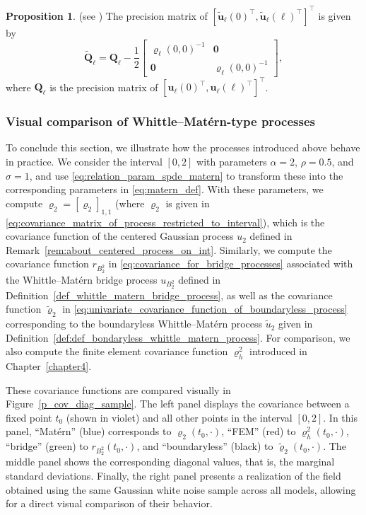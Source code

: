 \documentclass[11pt,a4paper]{article}
\theoremstyle{plain}
\theoremstyle{definition}
\newtheorem{proposition}{Proposition}
\begin{document}
\begin{proposition}
\label{prop:proposition_where_Q_edge}
    \textnormal{(see \cite[Proposition~7]{Bolin2023Statistical})}
    The precision matrix of $\left[\widetilde{\boldsymbol{u}}_\ell(0)^\top,\widetilde{\boldsymbol{u}}_\ell(\ell)^\top\right]^\top$ is given by
\begin{equation}
\label{eq:Qedge}
	\widetilde{\mathbf{Q}}_\ell  = \mathbf{Q}_\ell - \frac{1}{2}\begin{bmatrix}
		\boldsymbol{\varrho}_\ell(0,0)^{-1} & \mathbf{0} \\
		\mathbf{0} & \boldsymbol{\varrho}_\ell(0,0)^{-1} 
	\end{bmatrix},
\end{equation}
where $\mathbf{Q}_\ell$ is the precision matrix of $\left[\boldsymbol{u}_\ell(0)^\top,\boldsymbol{u}_\ell(\ell)^\top\right]^\top$.
\end{proposition}

\subsubsection{Visual comparison of Whittle--Matérn-type processes}

To conclude this section, we illustrate how the processes introduced above behave in practice. We consider the interval $[0,2]$ with parameters $\alpha = 2$, $\rho = 0.5$, and $\sigma = 1$, and use \eqref{eq:relation_param_spde_matern} to transform these into the corresponding parameters in \eqref{eq:matern_def}.  With these parameters, we compute $\varrho_2 = [\boldsymbol{\varrho}_2]_{1,1}$ (where $\boldsymbol{\varrho}_2$ is given in \eqref{eq:covariance_matrix_of_process_restricted_to_interval}), which is the covariance function of the centered Gaussian process $u_2$ defined in Remark~\ref{rem:about_centered_process_on_int}. Similarly, we compute the covariance function $r_{B_{2}^2}$ in \eqref{eq:covariance_for_bridge_processes} associated with the Whittle--Matérn bridge process $u_{B_{2}^2}$ defined in Definition~\ref{def_whittle_matern_bridge_process}, as well as the covariance function $\widetilde{\varrho}_{2}$ in \eqref{eq:univariate_covariance_function_of_boundaryless_process} corresponding to the boundaryless Whittle--Matérn process $\widetilde{u}_2$ given in Definition~\ref{def:def_bondaryless_whittle_matern_process}. For comparison, we also compute the finite element covariance function $\varrho_h^2$ introduced in Chapter~\ref{chapter4}.

These covariance functions are compared visually in Figure~\ref{p_cov_diag_sample}. The left panel displays the covariance between a fixed point $t_0$ (shown in violet) and all other points in the interval $[0,2]$. In this panel, ``Matérn'' (blue) corresponds to $\varrho_2(t_0,\cdot)$, ``FEM'' (red) to $\varrho_h^2(t_0,\cdot)$, ``bridge'' (green) to $r_{B_{2}^2}(t_0,\cdot)$, and ``boundaryless'' (black) to $\widetilde{\varrho}_{2}(t_0,\cdot)$. The middle panel shows the corresponding diagonal values, that is, the marginal standard deviations. Finally, the right panel presents a realization of the field obtained using the same Gaussian white noise sample across all models, allowing for a direct visual comparison of their behavior.
\end{document}
